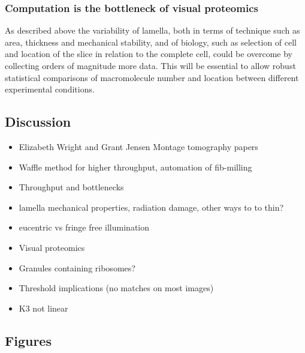 \documentclass[
]{article}
\begin{document}
\hypertarget{computation-is-the-bottleneck-of-visual-proteomics}{%
\subsubsection{Computation is the bottleneck of visual proteomics}\label{computation-is-the-bottleneck-of-visual-proteomics}}

As described above the variability of lamella, both in terms of technique such as area, thickness and mechanical stability, and of biology, such as selection of cell and location of the slice in relation to the complete cell, could be overcome by collecting orders of magnitude more data. This will be essential to allow robust statistical comparisons of macromolecule number and location between different experimental conditions.

\hypertarget{discussion}{%
\subsection{Discussion}\label{discussion}}

\begin{itemize}
\item
  Elizabeth Wright and Grant Jensen Montage tomography papers
\item
  Waffle method for higher throughput, automation of fib-milling
\item
  Throughput and bottlenecks
\item
  lamella mechanical properties, radiation damage, other ways to to thin?
\item
  eucentric vs fringe free illumination
\item
  Visual proteomics
\item
  Granules containing ribosomes?
\item
  Threshold implications (no matches on most images)
\item
  K3 not linear
\end{itemize}

\hypertarget{figures}{%
\subsection{Figures}\label{figures}}
\end{document}
